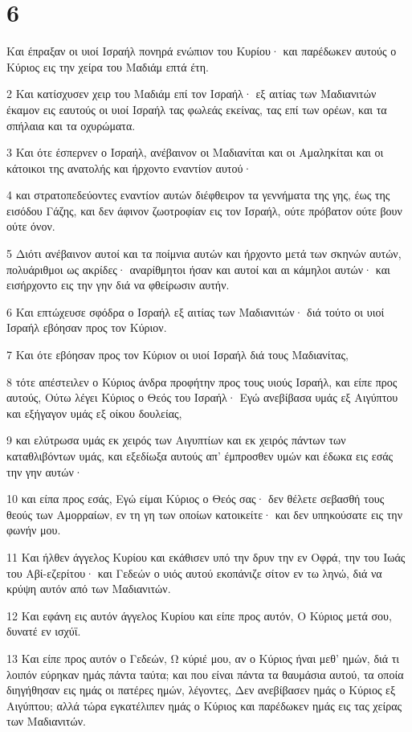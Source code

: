 \chapter{6}

\par Και έπραξαν οι υιοί Ισραήλ πονηρά ενώπιον του Κυρίου· και παρέδωκεν αυτούς ο Κύριος εις την χείρα του Μαδιάμ επτά έτη.
\par 2 Και κατίσχυσεν χειρ του Μαδιάμ επί τον Ισραήλ· εξ αιτίας των Μαδιανιτών έκαμον εις εαυτούς οι υιοί Ισραήλ τας φωλεάς εκείνας, τας επί των ορέων, και τα σπήλαια και τα οχυρώματα.
\par 3 Και ότε έσπερνεν ο Ισραήλ, ανέβαινον οι Μαδιανίται και οι Αμαληκίται και οι κάτοικοι της ανατολής και ήρχοντο εναντίον αυτού·
\par 4 και στρατοπεδεύοντες εναντίον αυτών διέφθειρον τα γεννήματα της γης, έως της εισόδου Γάζης, και δεν άφινον ζωοτροφίαν εις τον Ισραήλ, ούτε πρόβατον ούτε βουν ούτε όνον.
\par 5 Διότι ανέβαινον αυτοί και τα ποίμνια αυτών και ήρχοντο μετά των σκηνών αυτών, πολυάριθμοι ως ακρίδες· αναρίθμητοι ήσαν και αυτοί και αι κάμηλοι αυτών· και εισήρχοντο εις την γην διά να φθείρωσιν αυτήν.
\par 6 Και επτώχευσε σφόδρα ο Ισραήλ εξ αιτίας των Μαδιανιτών· διά τούτο οι υιοί Ισραήλ εβόησαν προς τον Κύριον.
\par 7 Και ότε εβόησαν προς τον Κύριον οι υιοί Ισραήλ διά τους Μαδιανίτας,
\par 8 τότε απέστειλεν ο Κύριος άνδρα προφήτην προς τους υιούς Ισραήλ, και είπε προς αυτούς, Ούτω λέγει Κύριος ο Θεός του Ισραήλ· Εγώ ανεβίβασα υμάς εξ Αιγύπτου και εξήγαγον υμάς εξ οίκου δουλείας,
\par 9 και ελύτρωσα υμάς εκ χειρός των Αιγυπτίων και εκ χειρός πάντων των καταθλιβόντων υμάς, και εξεδίωξα αυτούς απ' έμπροσθεν υμών και έδωκα εις εσάς την γην αυτών·
\par 10 και είπα προς εσάς, Εγώ είμαι Κύριος ο Θεός σας· δεν θέλετε σεβασθή τους θεούς των Αμορραίων, εν τη γη των οποίων κατοικείτε· και δεν υπηκούσατε εις την φωνήν μου.
\par 11 Και ήλθεν άγγελος Κυρίου και εκάθισεν υπό την δρυν την εν Οφρά, την του Ιωάς του Αβί-εζερίτου· και Γεδεών ο υιός αυτού εκοπάνιζε σίτον εν τω ληνώ, διά να κρύψη αυτόν από των Μαδιανιτών.
\par 12 Και εφάνη εις αυτόν άγγελος Κυρίου και είπε προς αυτόν, Ο Κύριος μετά σου, δυνατέ εν ισχύϊ.
\par 13 Και είπε προς αυτόν ο Γεδεών, Ω κύριέ μου, αν ο Κύριος ήναι μεθ' ημών, διά τι λοιπόν εύρηκαν ημάς πάντα ταύτα; και που είναι πάντα τα θαυμάσια αυτού, τα οποία διηγήθησαν εις ημάς οι πατέρες ημών, λέγοντες, Δεν ανεβίβασεν ημάς ο Κύριος εξ Αιγύπτου; αλλά τώρα εγκατέλιπεν ημάς ο Κύριος και παρέδωκεν ημάς εις τας χείρας των Μαδιανιτών.
